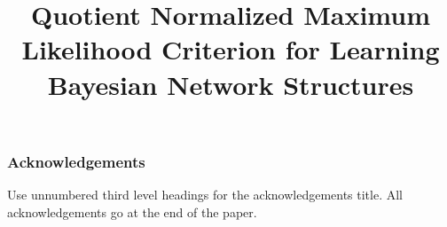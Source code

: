 \documentclass[letterpaper]{article}
\title{Quotient Normalized Maximum Likelihood Criterion for Learning Bayesian Network Structures}
\author{} %
\begin{document}
\maketitle



 




\subsubsection*{Acknowledgements}

Use unnumbered third level headings for the acknowledgements title.
All acknowledgements go at the end of the paper.





\end{document}
